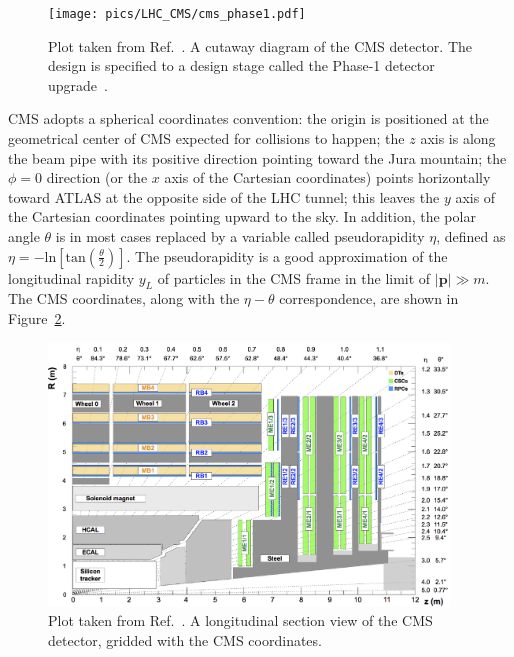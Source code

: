 \begin{figure}[!htb]
    \centering
    \captionsetup{justification=justified}
    \texttt{[image: pics/LHC\_CMS/cms\_phase1.pdf]}
    \caption{Plot taken from Ref.~\cite{Sakuma:2665537}. 
             A cutaway diagram of the CMS detector. 
             The design is specified to a design stage called the Phase-1 detector upgrade~\cite{arXiv:2012.14304, Mans:1481837,Tapper:1556311}.}
    \label{fig:cms_detector}
\end{figure}

CMS adopts a spherical coordinates convention: the origin is positioned at the geometrical center of CMS expected for collisions to happen;
the $z$ axis is along the beam pipe with its positive direction pointing toward the Jura mountain;
the $\phi = 0$ direction (or the $x$ axis of the Cartesian coordinates) points horizontally toward ATLAS at the opposite side of the LHC tunnel;
this leaves the $y$ axis of the Cartesian coordinates pointing upward to the sky.
In addition, the polar angle $\theta$ is in most cases replaced by a variable called pseudorapidity $\eta$, 
defined as $\eta = -\text{ln}[\text{tan}(\frac{\theta}{2})]$.
The pseudorapidity is a good approximation of the longitudinal rapidity $y_{L}$ of particles in the CMS frame in the limit of $|\textbf{p}| \gg m$.
The CMS coordinates, along with the $\eta - \theta$ correspondence, are shown in Figure~\ref{fig:cms_longitudinal}.

\begin{figure}[!htb]
    \centering
    \captionsetup{justification=justified}
    \includegraphics[width=0.95\textwidth]{pics/LHC_CMS/CMS_longitudinal.png}
    \caption{Plot taken from Ref.~\cite{Sirunyan_2018}. 
             A longitudinal section view of the CMS detector, gridded with the CMS coordinates.}
    \label{fig:cms_longitudinal}
\end{figure}


